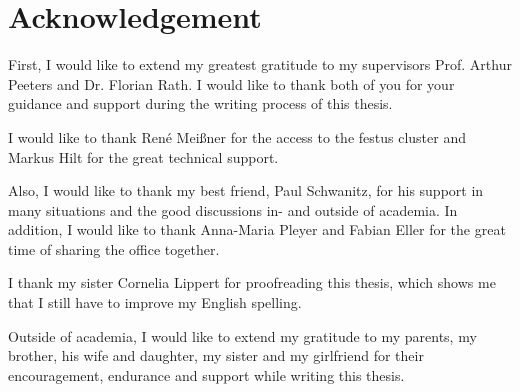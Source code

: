 \NewPage
\chapter*{Acknowledgement}
\label{chap:acknowledgement}

First, I would like to extend my greatest gratitude to my supervisors Prof. Arthur Peeters and Dr. Florian Rath. I would like to thank both of you for your guidance and support during the writing process of this thesis. \bigskip

I would like to thank René Meißner for the access to the festus cluster and Markus Hilt for the great technical support. \bigskip

Also, I would like to thank my best friend, Paul Schwanitz, for his support in many situations and the good discussions in- and outside of academia. In addition, I would like to thank Anna-Maria Pleyer and Fabian Eller for the great time of sharing the office together. \bigskip

I thank my sister Cornelia Lippert for proofreading this thesis, which shows me that I still have to improve my English spelling. \bigskip

Outside of academia, I would like to extend my gratitude to my parents, my brother, his wife and daughter, my sister and my girlfriend for their encouragement, endurance and support while writing this thesis. 